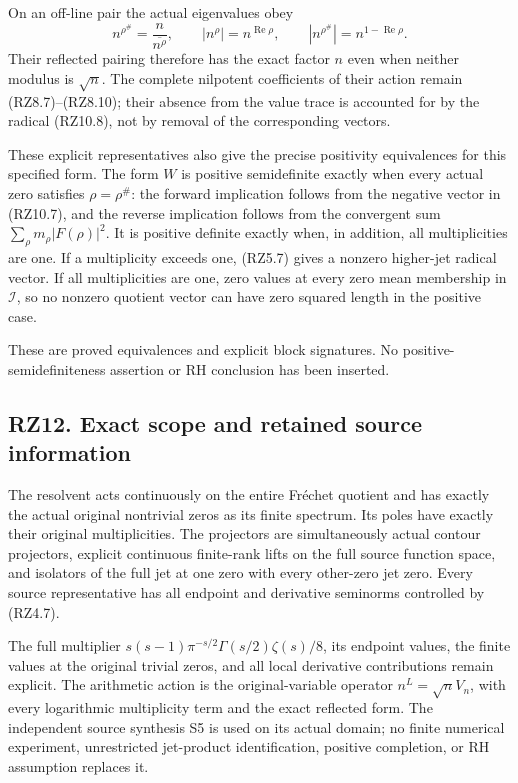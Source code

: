 \documentclass[
]{article}
\begin{document}
On an off-line pair the actual eigenvalues obey \[
n^{\rho^\#}=\frac{n}{\overline{n^\rho}},
\qquad
|n^\rho|=n^{\operatorname{Re}\rho},\qquad
|n^{\rho^\#}|=n^{1-\operatorname{Re}\rho}.
\tag{RZ11.6}
\] Their reflected pairing therefore has the exact factor \(n\) even
when neither modulus is \(\sqrt n\). The complete nilpotent coefficients
of their action remain (RZ8.7)--(RZ8.10); their absence from the value
trace is accounted for by the radical (RZ10.8), not by removal of the
corresponding vectors.

These explicit representatives also give the precise positivity
equivalences for this specified form. The form \(W\) is positive
semidefinite exactly when every actual zero satisfies \(\rho=\rho^\#\):
the forward implication follows from the negative vector in (RZ10.7),
and the reverse implication follows from the convergent sum
\(\sum_\rho m_\rho|F(\rho)|^2\). It is positive definite exactly when,
in addition, all multiplicities are one. If a multiplicity exceeds one,
(RZ5.7) gives a nonzero higher-jet radical vector. If all multiplicities
are one, zero values at every zero mean membership in \(\mathcal I\), so
no nonzero quotient vector can have zero squared length in the positive
case.

These are proved equivalences and explicit block signatures. No
positive-semidefiniteness assertion or RH conclusion has been inserted.

\subsection{RZ12. Exact scope and retained source
information}\label{rz12.-exact-scope-and-retained-source-information}

The resolvent acts continuously on the entire Fréchet quotient and has
exactly the actual original nontrivial zeros as its finite spectrum. Its
poles have exactly their original multiplicities. The projectors are
simultaneously actual contour projectors, explicit continuous
finite-rank lifts on the full source function space, and isolators of
the full jet at one zero with every other-zero jet zero. Every source
representative has all endpoint and derivative seminorms controlled by
(RZ4.7).

The full multiplier \(s(s-1)\pi^{-s/2}\Gamma(s/2)\zeta(s)/8\), its
endpoint values, the finite values at the original trivial zeros, and
all local derivative contributions remain explicit. The arithmetic
action is the original-variable operator \(n^L=\sqrt nV_n\), with every
logarithmic multiplicity term and the exact reflected form. The
independent source synthesis S5 is used on its actual domain; no finite
numerical experiment, unrestricted jet-product identification, positive
completion, or RH assumption replaces it.
\end{document}
